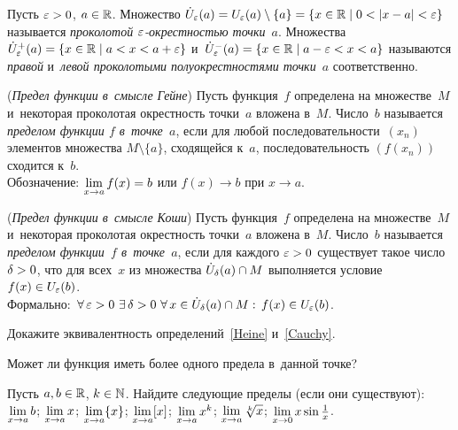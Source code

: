 \documentclass[a4paper,12pt]{article}
\newcommand{\sm}{\setminus}
\begin{document}
Пусть $\varepsilon > 0$, $a \in \mathbb{R}$. Множество $\dot U_\ep(a) = U_\ep(a) \sm \{a\} = \{x \in \R \mid 0<|x-a|<\ep\}$ называется \emph{проколотой $\varepsilon$-окрестностью точки}~$a$. Множества $\dot U_\varepsilon^+(a) = \{x\in \mathbb{R} \mid a<x<a+\varepsilon\}$ и~$\dot U_\varepsilon^-(a)=\{x\in \mathbb{R} \mid a-\varepsilon<x<a\}$ называются \emph{правой} и~\emph{левой проколотыми полуокрестностями точки}~$a$ соответственно.

%

\label{Heine}
(\emph{Предел функции в~смысле Гейне})\; Пусть функция~$f$ определена на множестве~$M$
и~некоторая проколотая окрестность точки~$a$ вложена в~$M$.
Число~$b$ называется \emph{пределом функции $f$ в~точке~$a$}, если для любой последовательности~$(x_n)$ элементов множества $M\sm\{a\}$, сходящейся к~$a$, последовательность $(f(x_n))$ сходится к~$b$.\\
Обозначение: $\lim\limits_{x \rightarrow a}f(x) = b$ или $f(x)\to b$ при $x\to a$.

\label{Cauchy}
(\emph{Предел функции в~смысле Коши})\; Пусть функция~$f$ определена на множестве~$M$
и~некоторая проколотая окрестность точки~$a$ вложена в~$M$.
Число~$b$ называется \emph{пределом функции~$f$ в~точке~$a$}, если для каждого $\varepsilon>0$ существует такое число $\delta>0$, что для всех~$x$ из множества $\dot U_\delta(a)\cap M$ выполняется условие $f(x)\in U_\varepsilon(b)$.\\
Формально:  $\,\forall\, \varepsilon>0 \,\,\exists\, \delta>0 \,\,\forall\, x\in\dot U_\delta(a)\cap M:\,f(x)\in U_\varepsilon(b)$.

Докажите эквивалентность определений~\ref{Heine} и~\ref{Cauchy}.

Может ли функция иметь более одного предела в~данной точке?

Пусть $a,b\in\mathbb{R}$, $k\in\mathbb{N}$. Найдите следующие пределы (если они существуют):\\
$\lim\limits_{x \rightarrow a}b$;
$\lim\limits_{x \rightarrow a}x$;
$\lim\limits_{x \rightarrow a}\{x\}$;
$\lim\limits_{x \rightarrow a}[x]$;
$\lim\limits_{x \rightarrow a}x^k$;
$\lim\limits_{x \rightarrow a}\sqrt[k]x$;
$\lim\limits_{x \rightarrow 0}x\sin\frac1x$.
\end{document}
